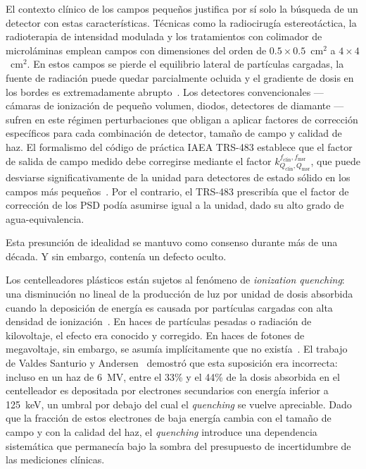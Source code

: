 \documentclass[11pt,a4paper]{article}
\begin{document}
El contexto clínico de los campos pequeños justifica por sí solo la búsqueda de un detector con estas características. Técnicas como la radiocirugía estereotáctica, la radioterapia de intensidad modulada y los tratamientos con colimador de microláminas emplean campos con dimensiones del orden de $0{.}5 \times 0{.}5$~cm$^{2}$ a $4 \times 4$~cm$^{2}$. En estos campos se pierde el equilibrio lateral de partículas cargadas, la fuente de radiación puede quedar parcialmente ocluida y el gradiente de dosis en los bordes es extremadamente abrupto~\cite{palmans2018}. Los detectores convencionales --- cámaras de ionización de pequeño volumen, diodos, detectores de diamante --- sufren en este régimen perturbaciones que obligan a aplicar factores de corrección específicos para cada combinación de detector, tamaño de campo y calidad de haz. El formalismo del código de práctica IAEA TRS-483 establece que el factor de salida de campo medido debe corregirse mediante el factor $k^{f_{\mathrm{clin}},f_{\mathrm{msr}}}_{Q_{\mathrm{clin}},Q_{\mathrm{msr}}}$, que puede desviarse significativamente de la unidad para detectores de estado sólido en los campos más pequeños~\cite{palmans2018}. Por el contrario, el TRS-483 prescribía que el factor de corrección de los PSD podía asumirse igual a la unidad, dado su alto grado de agua-equivalencia.

Esta presunción de idealidad se mantuvo como consenso durante más de una década. Y sin embargo, contenía un defecto oculto.

Los centelleadores plásticos están sujetos al fenómeno de \textit{ionization quenching}: una disminución no lineal de la producción de luz por unidad de dosis absorbida cuando la deposición de energía es causada por partículas cargadas con alta densidad de ionización~\cite{beddar1992,santurio2019}. En haces de partículas pesadas o radiación de kilovoltaje, el efecto era conocido y corregido. En haces de fotones de megavoltaje, sin embargo, se asumía implícitamente que no existía~\cite{palmans2018}. El trabajo de Valdes Santurio y Andersen~\cite{santurio2019} demostró que esta suposición era incorrecta: incluso en un haz de 6~MV, entre el 33\% y el 44\% de la dosis absorbida en el centelleador es depositada por electrones secundarios con energía inferior a 125~keV, un umbral por debajo del cual el \textit{quenching} se vuelve apreciable. Dado que la fracción de estos electrones de baja energía cambia con el tamaño de campo y con la calidad del haz, el \textit{quenching} introduce una dependencia sistemática que permanecía bajo la sombra del presupuesto de incertidumbre de las mediciones clínicas.
\end{document}
